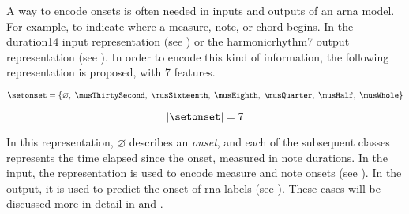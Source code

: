 
A way to encode onsets is often needed in inputs and outputs
of an \gls{arna} model. For example, to indicate where a
measure, note, or chord begins. In the \gls{duration14}
input representation (see
) or the
\gls{harmonicrhythm7} output representation (see
). In order to encode this
kind of information, the following representation is
proposed, with 7 features.

\begin{equation}
    \label{eq:onset_7}
    \setonset = \{\varnothing,\; \musThirtySecond,\; \musSixteenth,\; 
    \musEighth,\; \musQuarter,\; \musHalf,\; \musWhole \}
\end{equation}

\begin{equation}
    \label{eq:onset_7_magnitude}
    | \setonset | = 7
\end{equation}

In this representation, $\varnothing$ describes an
\emph{onset}, and each of the subsequent classes represents
the time elapsed since the onset, measured in note
durations. In the input, the representation is used to
encode measure and note onsets (see
). In the output, it is
used to predict the onset of \gls{rna} labels (see
). These cases will be
discussed more in detail in
 and
.
